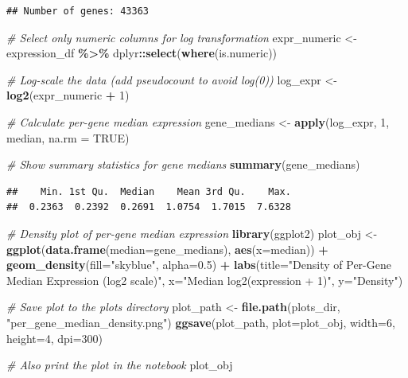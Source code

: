 \documentclass[
]{article}
\newenvironment{Shaded}{\begin{snugshade}}{\end{snugshade}}
\newcommand{\AttributeTok}[1]{\textcolor[rgb]{0.13,0.29,0.53}{#1}}
\newcommand{\CommentTok}[1]{\textcolor[rgb]{0.56,0.35,0.01}{\textit{#1}}}
\newcommand{\ConstantTok}[1]{\textcolor[rgb]{0.56,0.35,0.01}{#1}}
\newcommand{\DecValTok}[1]{\textcolor[rgb]{0.00,0.00,0.81}{#1}}
\newcommand{\FloatTok}[1]{\textcolor[rgb]{0.00,0.00,0.81}{#1}}
\newcommand{\FunctionTok}[1]{\textcolor[rgb]{0.13,0.29,0.53}{\textbf{#1}}}
\newcommand{\NormalTok}[1]{#1}
\newcommand{\OtherTok}[1]{\textcolor[rgb]{0.56,0.35,0.01}{#1}}
\newcommand{\SpecialCharTok}[1]{\textcolor[rgb]{0.81,0.36,0.00}{\textbf{#1}}}
\newcommand{\StringTok}[1]{\textcolor[rgb]{0.31,0.60,0.02}{#1}}
\begin{document}
\begin{verbatim}
## Number of genes: 43363
\end{verbatim}

\begin{Shaded}
\begin{Highlighting}[]
\CommentTok{\# Select only numeric columns for log transformation}
\NormalTok{expr\_numeric }\OtherTok{\textless{}{-}}\NormalTok{ expression\_df }\SpecialCharTok{\%\textgreater{}\%}\NormalTok{ dplyr}\SpecialCharTok{::}\FunctionTok{select}\NormalTok{(}\FunctionTok{where}\NormalTok{(is.numeric))}

\CommentTok{\# Log{-}scale the data (add pseudocount to avoid log(0))}
\NormalTok{log\_expr }\OtherTok{\textless{}{-}} \FunctionTok{log2}\NormalTok{(expr\_numeric }\SpecialCharTok{+} \DecValTok{1}\NormalTok{)}

\CommentTok{\# Calculate per{-}gene median expression}
\NormalTok{gene\_medians }\OtherTok{\textless{}{-}} \FunctionTok{apply}\NormalTok{(log\_expr, }\DecValTok{1}\NormalTok{, median, }\AttributeTok{na.rm =} \ConstantTok{TRUE}\NormalTok{)}

\CommentTok{\# Show summary statistics for gene medians}
\FunctionTok{summary}\NormalTok{(gene\_medians)}
\end{Highlighting}
\end{Shaded}

\begin{verbatim}
##    Min. 1st Qu.  Median    Mean 3rd Qu.    Max. 
##  0.2363  0.2392  0.2691  1.0754  1.7015  7.6328
\end{verbatim}

\begin{Shaded}
\begin{Highlighting}[]
\CommentTok{\# Density plot of per{-}gene median expression}
\FunctionTok{library}\NormalTok{(ggplot2)}
\NormalTok{plot\_obj }\OtherTok{\textless{}{-}} \FunctionTok{ggplot}\NormalTok{(}\FunctionTok{data.frame}\NormalTok{(}\AttributeTok{median=}\NormalTok{gene\_medians), }\FunctionTok{aes}\NormalTok{(}\AttributeTok{x=}\NormalTok{median)) }\SpecialCharTok{+}
  \FunctionTok{geom\_density}\NormalTok{(}\AttributeTok{fill=}\StringTok{"skyblue"}\NormalTok{, }\AttributeTok{alpha=}\FloatTok{0.5}\NormalTok{) }\SpecialCharTok{+}
  \FunctionTok{labs}\NormalTok{(}\AttributeTok{title=}\StringTok{"Density of Per{-}Gene Median Expression (log2 scale)"}\NormalTok{,}
       \AttributeTok{x=}\StringTok{"Median log2(expression + 1)"}\NormalTok{,}
       \AttributeTok{y=}\StringTok{"Density"}\NormalTok{)}

\CommentTok{\# Save plot to the plots directory}
\NormalTok{plot\_path }\OtherTok{\textless{}{-}} \FunctionTok{file.path}\NormalTok{(plots\_dir, }\StringTok{"per\_gene\_median\_density.png"}\NormalTok{)}
\FunctionTok{ggsave}\NormalTok{(plot\_path, }\AttributeTok{plot=}\NormalTok{plot\_obj, }\AttributeTok{width=}\DecValTok{6}\NormalTok{, }\AttributeTok{height=}\DecValTok{4}\NormalTok{, }\AttributeTok{dpi=}\DecValTok{300}\NormalTok{)}

\CommentTok{\# Also print the plot in the notebook}
\NormalTok{plot\_obj}
\end{Highlighting}
\end{Shaded}
\end{document}
